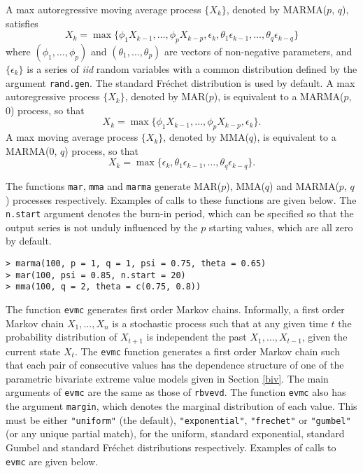 \documentclass[11pt,a4paper]{article}
\begin{document}
A max autoregressive moving average process $\{X_k\}$, denoted by MARMA($p$, $q$), satisfies
\begin{equation*}
X_k = \max\{\phi_1 X_{k-1}, \dots, \phi_p X_{k-p}, \epsilon_k, \theta_1 \epsilon_{k-1}, \dots, \theta_q \epsilon_{k-q}\}
\end{equation*}
where $(\phi_1, \dots, \phi_p)$ and $(\theta_1, \ldots, \theta_p)$ are vectors of non-negative parameters, and $\{\epsilon_k\}$ is a series of \emph{iid} random variables with a common distribution defined by the argument \verb+rand.gen+. The standard Fr\'{e}chet distribution is used by default.
A max autoregressive process $\{X_k\}$, denoted by MAR($p$), is equivalent to a MARMA($p$, 0) process, so that
\begin{equation*}
X_k = \max\{\phi_1 X_{k-1}, \dots, \phi_p X_{k-p}, \epsilon_k\}.
\end{equation*}
A max moving average process $\{X_k\}$, denoted by MMA($q$), is equivalent to a MARMA(0, $q$) process, so that
\begin{equation*}
X_k = \max\{\epsilon_k, \theta_1 \epsilon_{k-1}, \dots, \theta_q \epsilon_{k-q}\}.
\end{equation*}

The functions \verb+mar+, \verb+mma+ and \verb+marma+ generate MAR($p$), MMA($q$) and MARMA($p$, $q$) processes respectively.
Examples of calls to these functions are given below.
The \verb+n.start+ argument denotes the burn-in period, which can be specified so that the output series is not unduly influenced by the $p$ starting values, which are all zero by default.

\begin{verbatim}
> marma(100, p = 1, q = 1, psi = 0.75, theta = 0.65)
> mar(100, psi = 0.85, n.start = 20)
> mma(100, q = 2, theta = c(0.75, 0.8))
\end{verbatim}

The function \verb+evmc+ generates first order Markov chains.
Informally, a first order Markov chain $X_1, \ldots, X_n$ is a stochastic process such that at any given time $t$ the probability distribution of $X_{t+1}$ is independent the past $X_1, \ldots, X_{t-1}$, given the current state $X_t$.
The \verb+evmc+ function generates a first order Markov chain such that each pair of consecutive values has the dependence structure of one of the parametric bivariate extreme value models given in Section \ref{biv}.
The main arguments of \verb+evmc+ are the same as those of \verb+rbvevd+.
The function \verb+evmc+ also has the argument \verb+margin+, which denotes the marginal distribution of each value.
This must be either \verb+"uniform"+ (the default), \verb+"exponential"+, \verb+"frechet"+ or \verb+"gumbel"+ (or any unique partial match), for the uniform, standard exponential, standard Gumbel and standard Fr\'{e}chet distributions respectively.
Examples of calls to \verb+evmc+ are given below.
\end{document}
